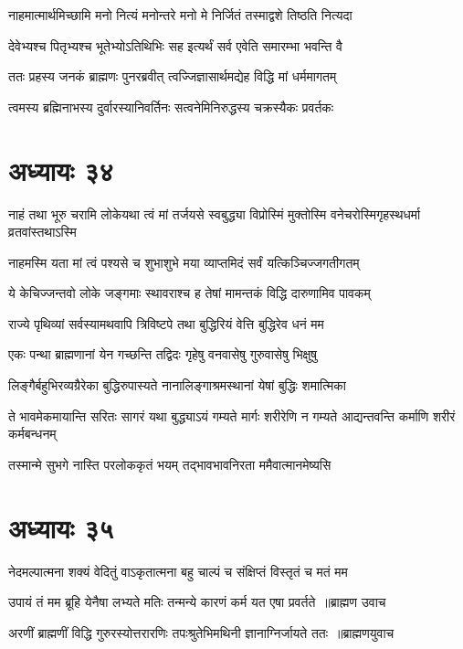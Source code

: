 \twolineshloka
{नाहमात्मार्थमिच्छामि मनो नित्यं मनोन्तरे}
{मनो मे निर्जितं तस्माद्वशे तिष्ठति नित्यदा}


\twolineshloka
{देवेभ्यश्च पितृभ्यश्च भूतेभ्योऽतिथिभिः सह}
{इत्यर्थं सर्व एवेति समारम्भा भवन्ति वै}


\twolineshloka
{ततः प्रहस्य जनकं ब्राह्मणः पुनरब्रवीत्}
{त्वज्जिज्ञासार्थमद्येह विद्धि मां धर्ममागतम्}


\twolineshloka
{त्वमस्य ब्रह्मिनाभस्य दुर्वारस्यानिवर्तिनः}
{सत्वनेमिनिरुद्धस्य चक्रस्यैकः प्रवर्तकः}


\chapter{अध्यायः ३४}
\twolineshloka
{नाहं तथा भूरु चरामि लोकेयथा त्वं मां तर्जयसे स्वबुद्ध्या}
{विप्रोस्मिं मुक्तोस्मि वनेचरोस्मिगृहस्थधर्मा व्रतवांस्तथाऽस्मि}


\twolineshloka
{नाहमस्मि यता मां त्वं पश्यसे च शुभाशुभे}
{मया व्याप्तमिदं सर्वं यत्किञ्चिज्जगतीगतम्}


\twolineshloka
{ये केचिज्जन्तवो लोके जङ्गमाः स्थावराश्च ह}
{तेषां मामन्तकं विद्धि दारुणामिव पावकम्}


\twolineshloka
{राज्ये पृथिव्यां सर्वस्यामथवापि त्रिविष्टपे}
{तथा बुद्धिरियं वेत्ति बुद्धिरेव धनं मम}


\twolineshloka
{एकः पन्था ब्राह्मणानां येन गच्छन्ति तद्विदः}
{गृहेषु वनवासेषु गुरुवासेषु भिक्षुषु}


\twolineshloka
{लिङ्गैर्बहुभिरव्यग्रैरेका बुद्धिरुपास्यते}
{नानालिङ्गाश्रमस्थानां येषां बुद्धिः शमात्मिका}


\threelineshloka
{ते भावमेकमायान्ति सरितः सागरं यथा}
{बुद्ध्याऽयं गम्यते मार्गः शरीरेणि न गम्यते}
{आद्यन्तवन्ति कर्माणि शरीरं कर्मबन्धनम्}


\twolineshloka
{तस्मान्मे सुभगे नास्ति परलोककृतं भयम्}
{तद्भावभावनिरता ममैवात्मानमेष्यसि}


\chapter{अध्यायः ३५}
\twolineshloka
{नेदमल्पात्मना शक्यं वेदितुं वाऽकृतात्मना}
{बहु चाल्पं च संक्षिप्तं विस्तृतं च मतं मम}


\threelineshloka
{उपायं तं मम ब्रूहि येनैषा लभ्यते मतिः}
{तन्मन्ये कारणं कर्म यत एषा प्रवर्तते ॥ब्राह्मण उवाच}
{}


\threelineshloka
{अरणीं ब्राह्मणीं विद्धि गुरुरस्योत्तरारणिः}
{तपःश्रुतेभिमथिनी ज्ञानाग्निर्जायते ततः ॥ब्राह्मणयुवाच}
{}


